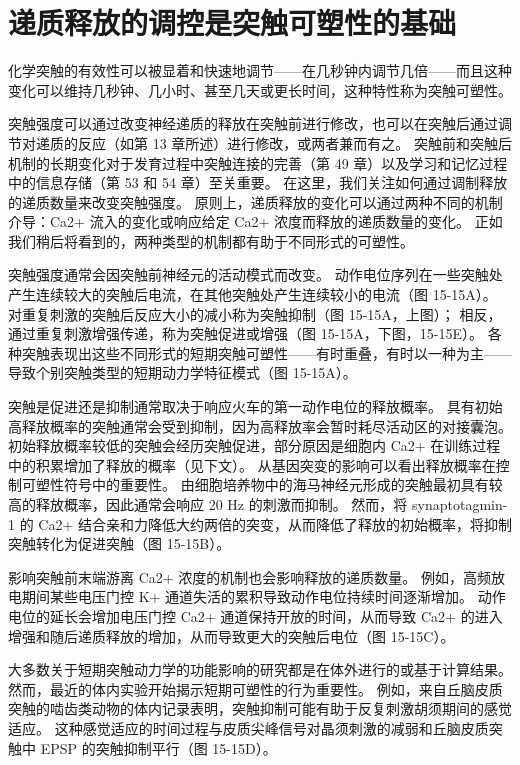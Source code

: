\section{递质释放的调控是突触可塑性的基础}
化学突触的有效性可以被显着和快速地调节——在几秒钟内调节几倍——而且这种变化可以维持几秒钟、几小时、甚至几天或更长时间，这种特性称为突触可塑性。

突触强度可以通过改变神经递质的释放在突触前进行修改，也可以在突触后通过调节对递质的反应（如第 13 章所述）进行修改，或两者兼而有之。 突触前和突触后机制的长期变化对于发育过程中突触连接的完善（第 49 章）以及学习和记忆过程中的信息存储（第 53 和 54 章）至关重要。 在这里，我们关注如何通过调制释放的递质数量来改变突触强度。 原则上，递质释放的变化可以通过两种不同的机制介导：Ca2+ 流入的变化或响应给定 Ca2+ 浓度而释放的递质数量的变化。 正如我们稍后将看到的，两种类型的机制都有助于不同形式的可塑性。

突触强度通常会因突触前神经元的活动模式而改变。 动作电位序列在一些突触处产生连续较大的突触后电流，在其他突触处产生连续较小的电流（图 15-15A）。 对重复刺激的突触后反应大小的减小称为突触抑制（图 15-15A，上图）； 相反，通过重复刺激增强传递，称为突触促进或增强（图 15-15A，下图，15-15E）。 各种突触表现出这些不同形式的短期突触可塑性——有时重叠，有时以一种为主——导致个别突触类型的短期动力学特征模式（图 15-15A）。

突触是促进还是抑制通常取决于响应火车的第一动作电位的释放概率。 具有初始高释放概率的突触通常会受到抑制，因为高释放率会暂时耗尽活动区的对接囊泡。 初始释放概率较低的突触会经历突触促进，部分原因是细胞内 Ca2+ 在训练过程中的积累增加了释放的概率（见下文）。 从基因突变的影响可以看出释放概率在控制可塑性符号中的重要性。 由细胞培养物中的海马神经元形成的突触最初具有较高的释放概率，因此通常会响应 20 Hz 的刺激而抑制。 然而，将 synaptotagmin-1 的 Ca2+ 结合亲和力降低大约两倍的突变，从而降低了释放的初始概率，将抑制突触转化为促进突触（图 15-15B）。

影响突触前末端游离 Ca2+ 浓度的机制也会影响释放的递质数量。 例如，高频放电期间某些电压门控 K+ 通道失活的累积导致动作电位持续时间逐渐增加。 动作电位的延长会增加电压门控 Ca2+ 通道保持开放的时间，从而导致 Ca2+ 的进入增强和随后递质释放的增加，从而导致更大的突触后电位（图 15-15C）。

大多数关于短期突触动力学的功能影响的研究都是在体外进行的或基于计算结果。 然而，最近的体内实验开始揭示短期可塑性的行为重要性。 例如，来自丘脑皮质突触的啮齿类动物的体内记录表明，突触抑制可能有助于反复刺激胡须期间的感觉适应。 这种感觉适应的时间过程与皮质尖峰信号对晶须刺激的减弱和丘脑皮质突触中 EPSP 的突触抑制平行（图 15-15D）。

